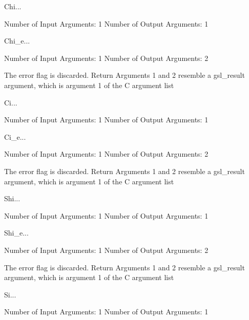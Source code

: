 \begin{funcdesc}{Chi}{...}

    Number of Input  Arguments:  1
    Number of Output Arguments:  1
\end{funcdesc}

\begin{funcdesc}{Chi_e}{...}

    Number of Input  Arguments:  1
    Number of Output Arguments:  2

The error flag is discarded.
Return Arguments 1 and 2 resemble a gsl_result argument,
	which is  argument 1 of the C argument list

\end{funcdesc}

\begin{funcdesc}{Ci}{...}

    Number of Input  Arguments:  1
    Number of Output Arguments:  1
\end{funcdesc}

\begin{funcdesc}{Ci_e}{...}

    Number of Input  Arguments:  1
    Number of Output Arguments:  2

The error flag is discarded.
Return Arguments 1 and 2 resemble a gsl_result argument,
	which is  argument 1 of the C argument list

\end{funcdesc}

\begin{funcdesc}{Shi}{...}

    Number of Input  Arguments:  1
    Number of Output Arguments:  1
\end{funcdesc}

\begin{funcdesc}{Shi_e}{...}

    Number of Input  Arguments:  1
    Number of Output Arguments:  2

The error flag is discarded.
Return Arguments 1 and 2 resemble a gsl_result argument,
	which is  argument 1 of the C argument list

\end{funcdesc}

\begin{funcdesc}{Si}{...}

    Number of Input  Arguments:  1
    Number of Output Arguments:  1
\end{funcdesc}

